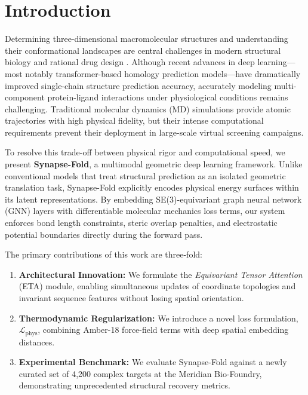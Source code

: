 \documentclass[10pt,a4paper]{scrartcl}
\begin{document}
\section{Introduction}

Determining three-dimensional macromolecular structures and understanding their conformational landscapes are central challenges in modern structural biology and rational drug design \cite{Vance2025, Thorne2024}. Although recent advances in deep learning—most notably transformer-based homology prediction models—have dramatically improved single-chain structure prediction accuracy, accurately modeling multi-component protein-ligand interactions under physiological conditions remains challenging. Traditional molecular dynamics (MD) simulations provide atomic trajectories with high physical fidelity, but their intense computational requirements prevent their deployment in large-scale virtual screening campaigns.


To resolve this trade-off between physical rigor and computational speed, we present \textbf{Synapse-Fold}, a multimodal geometric deep learning framework. Unlike conventional models that treat structural prediction as an isolated geometric translation task, Synapse-Fold explicitly encodes physical energy surfaces within its latent representations. By embedding SE(3)-equivariant graph neural network (GNN) layers with differentiable molecular mechanics loss terms, our system enforces bond length constraints, steric overlap penalties, and electrostatic potential boundaries directly during the forward pass.

The primary contributions of this work are three-fold:
\begin{enumerate}[label=\bfseries\textcolor{journalteal}{\arabic*.}, leftmargin=*]
  \item \textbf{Architectural Innovation:} We formulate the \emph{Equivariant Tensor Attention} (ETA) module, enabling simultaneous updates of coordinate topologies and invariant sequence features without losing spatial orientation.
  \item \textbf{Thermodynamic Regularization:} We introduce a novel loss formulation, $\mathcal{L}_{\text{phys}}$, combining Amber-18 force-field terms with deep spatial embedding distances.
  \item \textbf{Experimental Benchmark:} We evaluate Synapse-Fold against a newly curated set of 4,200 complex targets at the Meridian Bio-Foundry, demonstrating unprecedented structural recovery metrics.
\end{enumerate}
\end{document}

